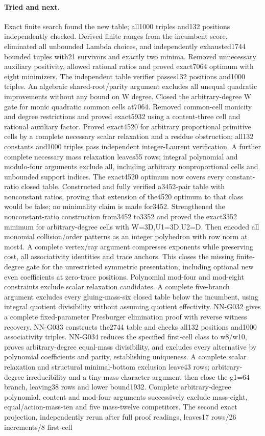 \paragraph{Tried and next.} Exact finite search found the new table; all1000 triples and132 positions independently checked. Derived finite ranges from the incumbent score, eliminated all unbounded Lambda choices, and independently exhausted1744 bounded tuples with21 survivors and exactly two minima. Removed unnecessary auxiliary positivity, allowed rational ratios and proved exact7064 optimum with eight minimizers. The independent table verifier passes132 positions and1000 triples. An algebraic shared-root/parity argument excludes all unequal quadratic improvements without any bound on W degree. Closed the arbitrary-degree W gate for monic quadratic common cells at7064. Removed common-cell monicity and degree restrictions and proved exact5932 using a content-three cell and rational auxiliary factor. Proved exact4520 for arbitrary proportional primitive cells by a complete necessary scalar relaxation and a residue obstruction; all132 constants and1000 triples pass independent integer-Laurent verification. A further complete necessary mass relaxation leaves55 rows; integral polynomial and modulo-four arguments exclude all, including arbitrary nonproportional cells and unbounded support indices. The exact4520 optimum now covers every constant-ratio closed table. Constructed and fully verified a3452-pair table with nonconstant ratios, proving that extension of the4520 optimum to that class would be false; no minimality claim is made for3452. Strengthened the nonconstant-ratio construction from3452 to3352 and proved the exact3352 minimum for arbitrary-degree cells with W=3D,U1=3D,U2=D. Then encoded all monomial collision/order patterns as an integer polyhedron with row norm at most4. A complete vertex/ray argument compresses exponents while preserving cost, all associativity identities and trace anchors. This closes the missing finite-degree gate for the unrestricted symmetric presentation, including optional new even coefficients at zero-trace positions. Polynomial mod-four and mod-eight constraints exclude scalar relaxation candidates. A complete five-branch argument excludes every gluing-mass-six closed table below the incumbent, using integral quotient divisibility without assuming quotient effectivity. NN-G032 gives a complete fixed-parameter Presburger elimination proof with reverse witness recovery. NN-G033 constructs the2744 table and checks all132 positions and1000 associativity triples. NN-G034 reduces the specified first-cell class to w8/w10, proves arbitrary-degree equal-mass divisibility, and excludes every alternative by polynomial coefficients and parity, establishing uniqueness. A complete scalar relaxation and structural minimal-bottom exclusion leave43 rows; arbitrary-degree irreducibility and a tiny-mass character argument then close the g1=64 branch, leaving38 rows and lower bound1932. Complete arbitrary-degree polynomial, content and mod-four arguments successively exclude mass-eight, equal/action-mass-ten and five mass-twelve competitors. The second exact projection, independently rerun after full proof readings, leaves17 rows/26 increments/8 first-cell 